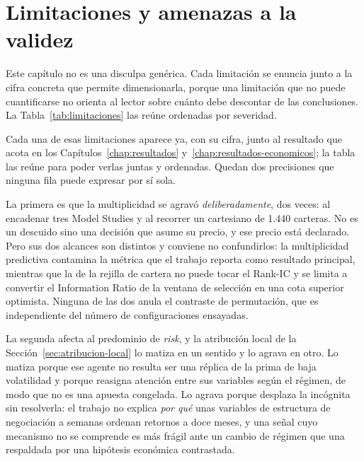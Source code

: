 \chapter{Limitaciones y amenazas a la validez}
\label{chap:limitaciones}

Este capítulo no es una disculpa genérica. Cada limitación se enuncia junto a la cifra concreta que
permite dimensionarla, porque una limitación que no puede cuantificarse no orienta al lector sobre
cuánto debe descontar de las conclusiones. La Tabla~\ref{tab:limitaciones} las reúne ordenadas por
severidad.

\begin{table}[H]
  \centering
  \footnotesize
  \caption{Limitaciones, evidencia que las cuantifica y severidad asignada.}
  \label{tab:limitaciones}
  
  \caption*{La severidad es un juicio del autor sobre cuánto condiciona cada limitación las
  conclusiones, no una medida estadística.}
\end{table}

Cada una de esas limitaciones aparece ya, con su cifra, junto al resultado que acota en los
Capítulos~\ref{chap:resultados} y~\ref{chap:resultados-economicos}; la tabla las reúne para poder
verlas juntas y ordenadas. Quedan dos precisiones que ninguna fila puede expresar por sí sola.

La primera es que la multiplicidad se agravó \emph{deliberadamente}, dos veces: al encadenar tres
Model Studies y al recorrer un cartesiano de 1.440 carteras. No es un descuido sino una decisión que
asume su precio, y ese precio está declarado. Pero sus dos alcances son distintos y conviene no
confundirlos: la multiplicidad predictiva contamina la métrica que el trabajo reporta como resultado
principal, mientras que la de la rejilla de cartera no puede tocar el Rank-IC y se limita a
convertir el Information Ratio de la ventana de selección en una cota superior optimista. Ninguna de
las dos anula el contraste de permutación, que es independiente del número de configuraciones
ensayadas.

La segunda afecta al predominio de \textit{risk}, y la atribución local de la
Sección~\ref{sec:atribucion-local} lo matiza en un sentido y lo agrava en otro. Lo matiza porque ese
agente no resulta ser una réplica de la prima de baja volatilidad y porque reasigna atención entre
sus variables según el régimen, de modo que no es una apuesta congelada. Lo agrava porque desplaza
la incógnita sin resolverla: el trabajo no explica \emph{por qué} unas variables de estructura de
negociación a semanas ordenan retornos a doce meses, y una señal cuyo mecanismo no se comprende es
más frágil ante un cambio de régimen que una respaldada por una hipótesis económica contrastada.

